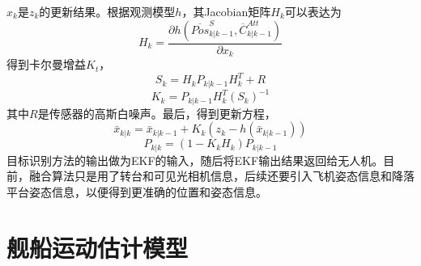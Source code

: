$x_k$是$z_k$的更新结果。根据观测模型$h$，其Jacobian矩阵$H_k$可以表达为
\begin{equation}
H_k=\frac{\partial h ( \overline{Pos}^S_{k|k-1}, \overline{C}^{Att}_{k|k-1} )}{\partial x_k} 
\end{equation}
得到卡尔曼增益$K_t$，
\begin{equation}
S_k=H_k P_{k|k-1} H^T_k + R
\end{equation}
\begin{equation}
K_k=P_{k|k-1}H^T_k(S_k)^{-1}
\end{equation}
其中$R$是传感器的高斯白噪声。最后，得到更新方程，
\begin{equation}
\bar{x}_{k|k} = \bar{x}_{k|k-1}+K_k(z_k-h(\bar{x}_{k|k-1}))
\end{equation}
\begin{equation}
P_{k|k}=(1-K_k H_k)P_{k|k-1}
\end{equation}
目标识别方法的输出做为EKF的输入，随后将EKF输出结果返回给无人机。目前，融合算法只是用了转台和可见光相机信息，后续还要引入飞机姿态信息和降落平台姿态信息，以便得到更准确的位置和姿态信息。

\section{舰船运动估计模型}
 
 
 
